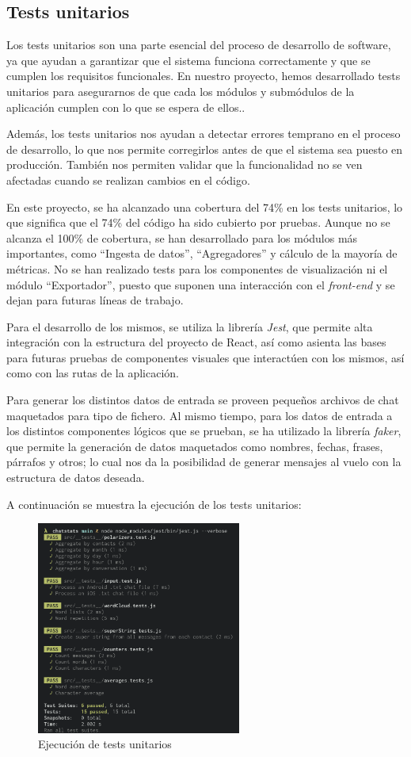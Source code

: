 \subsection{Tests unitarios}

Los tests unitarios son una parte esencial del proceso de desarrollo de software, ya que ayudan a garantizar que el sistema funciona correctamente y que se cumplen los requisitos funcionales. En nuestro proyecto, hemos desarrollado tests unitarios para asegurarnos de que cada los módulos y submódulos de la aplicación cumplen con lo que se espera de ellos..

Además, los tests unitarios nos ayudan a detectar errores temprano en el proceso de desarrollo, lo que nos permite corregirlos antes de que el sistema sea puesto en producción. También nos permiten validar que la funcionalidad no se ven afectadas cuando se realizan cambios en el código.

En este proyecto, se ha alcanzado una cobertura del 74\% en los tests unitarios, lo que significa que el 74\% del código ha sido cubierto por pruebas. Aunque no se alcanza el 100\% de cobertura, se han desarrollado para los módulos más importantes, como ``Ingesta de datos'', ``Agregadores'' y cálculo de la mayoría de métricas. No se han realizado tests para los componentes de visualización ni el módulo ``Exportador'', puesto que suponen una interacción con el \textit{front-end} y se dejan para futuras líneas de trabajo.

Para el desarrollo de los mismos, se utiliza la librería \textit{Jest}, que permite alta integración con la estructura del proyecto de React, así como asienta las bases para futuras pruebas de componentes visuales que interactúen con los mismos, así como con las rutas de la aplicación.

Para generar los distintos datos de entrada se proveen pequeños archivos de chat maquetados para tipo de fichero. Al mismo tiempo, para los datos de entrada a los distintos componentes lógicos que se prueban, se ha utilizado la librería \textit{faker}, que permite la generación de datos maquetados como nombres, fechas, frases, párrafos y otros; lo cual nos da la posibilidad de generar mensajes al vuelo con la estructura de datos deseada.

A continuación se muestra la ejecución de los tests unitarios:

\begin{figure}[H]
	\centering
	\includegraphics[width=0.6\textwidth]{img/tests.png}
	\caption{Ejecución de tests unitarios}
	\label{fig:chap4:architecture_tests}
\end{figure}
